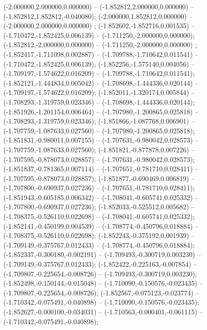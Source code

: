  (-2.000000,2.000000,0.000000) -- (-1.852812,2.000000,0.000000) -- (-1.852812,1.852812,-0.040080);
 (-2.000000,1.852812,0.000000) -- (-2.000000,2.000000,0.000000) ;
 (-1.852602,-1.852716,0.001535) -- (-1.710472,-1.852425,0.006139) -- (-1.711250,-2.000000,0.000000);
 (-1.852812,-2.000000,0.000000) -- (-1.711250,-2.000000,0.000000) ;
 (-1.852417,-1.711098,0.002887) -- (-1.709788,-1.710642,0.011541) -- (-1.710472,-1.852425,0.006139);
 (-1.852256,-1.575140,0.004056) -- (-1.709197,-1.574622,0.016209) -- (-1.709788,-1.710642,0.011541);
 (-1.852121,-1.444834,0.005042) -- (-1.708698,-1.444336,0.020144) -- (-1.709197,-1.574622,0.016209);
 (-1.852011,-1.320174,0.005844) -- (-1.708293,-1.319759,0.023346) -- (-1.708698,-1.444336,0.020144);
 (-1.851926,-1.201154,0.006464) -- (-1.707980,-1.200865,0.025818) -- (-1.708293,-1.319759,0.023346);
 (-1.851866,-1.087768,0.006901) -- (-1.707759,-1.087633,0.027560) -- (-1.707980,-1.200865,0.025818);
 (-1.851831,-0.980011,0.007155) -- (-1.707631,-0.980042,0.028573) -- (-1.707759,-1.087633,0.027560);
 (-1.851821,-0.877878,0.007226) -- (-1.707595,-0.878073,0.028857) -- (-1.707631,-0.980042,0.028573);
 (-1.851837,-0.781365,0.007114) -- (-1.707651,-0.781710,0.028411) -- (-1.707595,-0.878073,0.028857);
 (-1.851877,-0.690469,0.006819) -- (-1.707800,-0.690937,0.027236) -- (-1.707651,-0.781710,0.028411);
 (-1.851943,-0.605185,0.006342) -- (-1.708041,-0.605741,0.025332) -- (-1.707800,-0.690937,0.027236);
 (-1.852033,-0.525512,0.005682) -- (-1.708375,-0.526110,0.022698) -- (-1.708041,-0.605741,0.025332);
 (-1.852141,-0.450199,0.004539) -- (-1.708774,-0.450796,0.018884) -- (-1.708375,-0.526110,0.022698);
 (-1.852243,-0.375192,0.001939) -- (-1.709149,-0.375767,0.012433) -- (-1.708774,-0.450796,0.018884);
 (-1.852337,-0.300180,-0.002191) -- (-1.709493,-0.300719,0.003230) -- (-1.709149,-0.375767,0.012433);
 (-1.852422,-0.225163,-0.007854) -- (-1.709807,-0.225654,-0.008726) -- (-1.709493,-0.300719,0.003230);
 (-1.852498,-0.150144,-0.015048) -- (-1.710090,-0.150576,-0.023435) -- (-1.709807,-0.225654,-0.008726);
 (-1.852567,-0.075123,-0.023774) -- (-1.710342,-0.075491,-0.040898) -- (-1.710090,-0.150576,-0.023435);
 (-1.852627,-0.000100,-0.034031) -- (-1.710563,-0.000401,-0.061115) -- (-1.710342,-0.075491,-0.040898);
